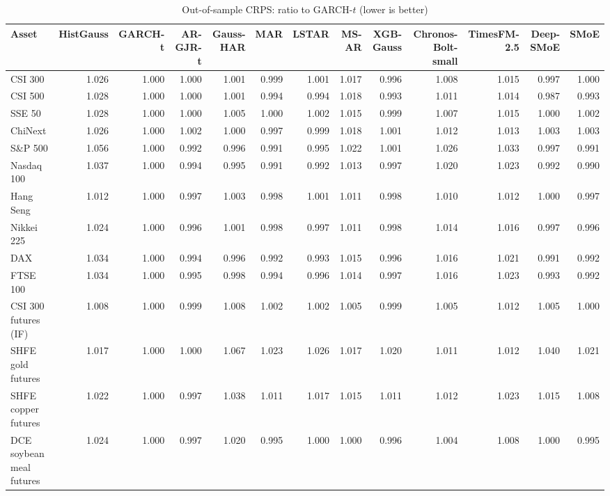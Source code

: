 \begin{table}[!htbp]\centering\scriptsize
\caption{Out-of-sample CRPS: ratio to GARCH-$t$ (lower is better)}\label{tab:loss_CRPS}
\begin{adjustbox}{max width=\textwidth}
\begin{tabular}{lrrrrrrrrrrrr}
\toprule
Asset & HistGauss & GARCH-t & AR-GJR-t & Gauss-HAR & MAR & LSTAR & MS-AR & XGB-Gauss & Chronos-Bolt-small & TimesFM-2.5 & Deep-SMoE & SMoE\\
\midrule
CSI 300 & 1.026 & 1.000 & 1.000 & 1.001 & 0.999 & 1.001 & 1.017 & 0.996 & 1.008 & 1.015 & 0.997 & 1.000\\
CSI 500 & 1.028 & 1.000 & 1.000 & 1.001 & 0.994 & 0.994 & 1.018 & 0.993 & 1.011 & 1.014 & 0.987 & 0.993\\
SSE 50 & 1.028 & 1.000 & 1.000 & 1.005 & 1.000 & 1.002 & 1.015 & 0.999 & 1.007 & 1.015 & 1.000 & 1.002\\
ChiNext & 1.026 & 1.000 & 1.002 & 1.000 & 0.997 & 0.999 & 1.018 & 1.001 & 1.012 & 1.013 & 1.003 & 1.003\\
S\&P 500 & 1.056 & 1.000 & 0.992 & 0.996 & 0.991 & 0.995 & 1.022 & 1.001 & 1.026 & 1.033 & 0.997 & 0.991\\
Nasdaq 100 & 1.037 & 1.000 & 0.994 & 0.995 & 0.991 & 0.992 & 1.013 & 0.997 & 1.020 & 1.023 & 0.992 & 0.990\\
Hang Seng & 1.012 & 1.000 & 0.997 & 1.003 & 0.998 & 1.001 & 1.011 & 0.998 & 1.010 & 1.012 & 1.000 & 0.997\\
Nikkei 225 & 1.024 & 1.000 & 0.996 & 1.001 & 0.998 & 0.997 & 1.011 & 0.998 & 1.014 & 1.016 & 0.997 & 0.996\\
DAX & 1.034 & 1.000 & 0.994 & 0.996 & 0.992 & 0.993 & 1.015 & 0.996 & 1.016 & 1.021 & 0.991 & 0.992\\
FTSE 100 & 1.034 & 1.000 & 0.995 & 0.998 & 0.994 & 0.996 & 1.014 & 0.997 & 1.016 & 1.023 & 0.993 & 0.992\\
CSI 300 futures (IF) & 1.008 & 1.000 & 0.999 & 1.008 & 1.002 & 1.002 & 1.005 & 0.999 & 1.005 & 1.012 & 1.005 & 1.000\\
SHFE gold futures & 1.017 & 1.000 & 1.000 & 1.067 & 1.023 & 1.026 & 1.017 & 1.020 & 1.011 & 1.012 & 1.040 & 1.021\\
SHFE copper futures & 1.022 & 1.000 & 0.997 & 1.038 & 1.011 & 1.017 & 1.015 & 1.011 & 1.012 & 1.023 & 1.015 & 1.008\\
DCE soybean meal futures & 1.024 & 1.000 & 0.997 & 1.020 & 0.995 & 1.000 & 1.000 & 0.996 & 1.004 & 1.008 & 1.000 & 0.995\\

\end{tabular}
\end{adjustbox}
\end{table}
